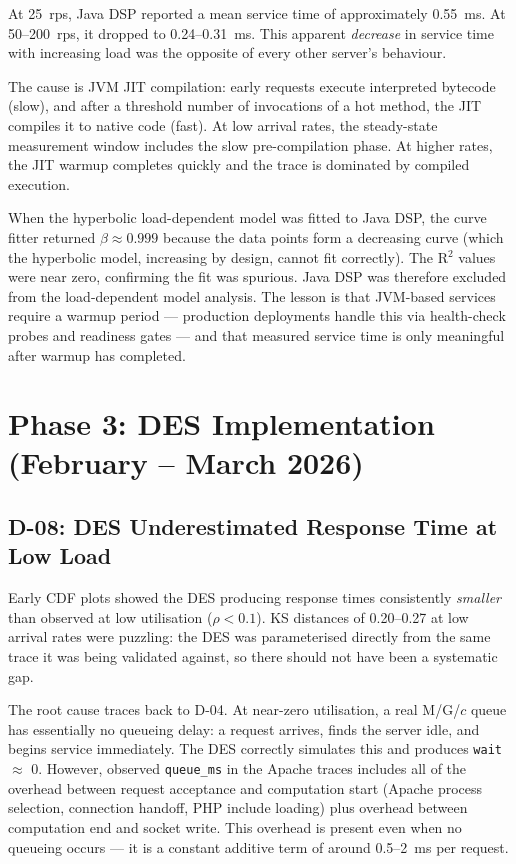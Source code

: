 At 25~rps, Java DSP reported a mean service time of approximately 0.55~ms. At 50--200~rps, it dropped to 0.24--0.31~ms. This apparent \emph{decrease} in service time with increasing load was the opposite of every other server's behaviour.

The cause is JVM JIT compilation: early requests execute interpreted bytecode (slow), and after a threshold number of invocations of a hot method, the JIT compiles it to native code (fast). At low arrival rates, the steady-state measurement window includes the slow pre-compilation phase. At higher rates, the JIT warmup completes quickly and the trace is dominated by compiled execution.

When the hyperbolic load-dependent model was fitted to Java DSP, the curve fitter returned $\beta \approx 0.999$ because the data points form a decreasing curve (which the hyperbolic model, increasing by design, cannot fit correctly). The R$^2$ values were near zero, confirming the fit was spurious. Java DSP was therefore excluded from the load-dependent model analysis. The lesson is that JVM-based services require a warmup period — production deployments handle this via health-check probes and readiness gates — and that measured service time is only meaningful after warmup has completed.

\section{Phase 3: DES Implementation (February -- March 2026)}
\label{sec:journey-phase3}

\subsection{D-08: DES Underestimated Response Time at Low Load}

Early CDF plots showed the DES producing response times consistently \emph{smaller} than observed at low utilisation ($\rho < 0.1$). KS distances of 0.20--0.27 at low arrival rates were puzzling: the DES was parameterised directly from the same trace it was being validated against, so there should not have been a systematic gap.

The root cause traces back to D-04. At near-zero utilisation, a real M/G/$c$ queue has essentially no queueing delay: a request arrives, finds the server idle, and begins service immediately. The DES correctly simulates this and produces \texttt{wait} $\approx$ 0. However, observed \texttt{queue\_ms} in the Apache traces includes all of the overhead between request acceptance and computation start (Apache process selection, connection handoff, PHP include loading) plus overhead between computation end and socket write. This overhead is present even when no queueing occurs — it is a constant additive term of around 0.5--2~ms per request.

